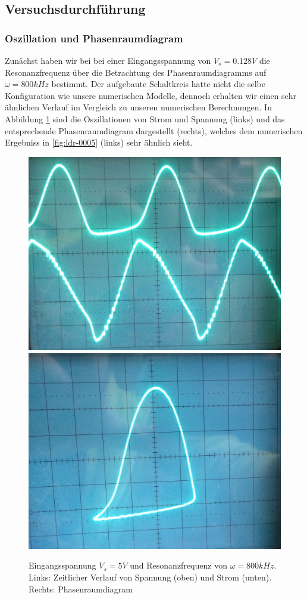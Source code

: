 \documentclass{scrartcl}
\begin{document}
\subsection { Versuchsdurchführung }
\subsubsection { Oszillation und Phasenraumdiagram }
Zunächst haben wir bei bei einer Eingangsspannung von $V_s=0.128V$ die Resonanzfrequenz über die Betrachtung des Phasenraumdiagramms auf $\omega=800kHz$ bestimmt. 
Der aufgebaute Schaltkreis hatte nicht die selbe Konfiguration wie unsere numerischen Modelle, dennoch erhalten wir einen sehr ähnlichen Verlauf im Vergleich zu unseren numerischen Berechnungen. In Abbildung \ref{fig:ldr-real1} sind die Oszillationen von Strom und Spannung (links) und das entsprechende Phasenraumdiagram dargestellt (rechts), welches dem numerischen Ergebniss in \ref{fig:ldr-0005} (links) sehr ähnlich sieht. 
\begin{figure}[!htbp]
\centering
\includegraphics[scale=0.1]{800khz-5V-oszi}
\includegraphics[scale=0.11]{800khz-5V-phase}
\caption{Eingangsspannung $V_s=5V$ und Resonanzfrequenz von $\omega=800kHz$. Links: Zeitlicher Verlauf von Spannung (oben) und Strom (unten). Rechts: Phasenraumdiagram}
\label{fig:ldr-real1}
\end{figure}
\end{document}
